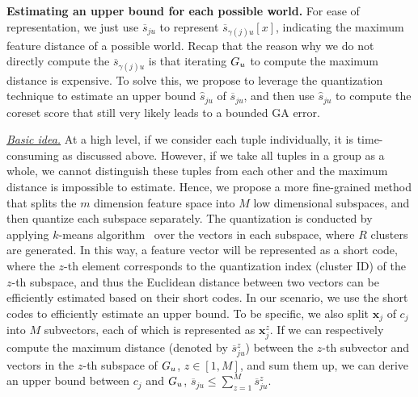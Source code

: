 \noindent \textbf{Estimating an upper bound for each possible world.} 
For ease of representation, we just use $\overline{s}_{ju}$ to represent  $\overline{s}_{\gamma(j)u}[x]$, indicating the maximum feature distance of a possible world.
%
%
 Recap that the reason why we do not directly compute the  $\overline{s}_{\gamma(j)u}$ is that iterating $G_u$ to compute the maximum distance is expensive.
To solve this, we propose to leverage the  quantization technique to estimate an upper bound $\hat{s}_{ju}$ of $\overline{s}_{ju}$, and then use $\hat{s}_{ju}$ to compute the coreset score  that still very likely leads to a bounded GA error.
  
\noindent  \underline{\textit{Basic idea.}} 
At a high level, if we consider each tuple individually, it is time-consuming as discussed above. However, if we take all tuples in a group as a whole, we cannot distinguish these tuples from each other and the maximum distance is impossible to estimate. Hence, we propose a more fine-grained  method that  splits the $m$ dimension feature space into  $M$ low dimensional subspaces, and then quantize each subspace separately.  
The quantization is conducted by applying $k$-means algorithm~\cite{hartigan1979algorithm} over the vectors in each subspace, where $R$ clusters are generated.  
In this way, a feature vector will be represented as a short code, where the $z$-th element corresponds to the quantization index (\ie cluster ID) of the $z$-th subspace, and thus the Euclidean distance between two vectors can be efficiently estimated based on their short codes. 
  In our scenario, we use the short codes to efficiently estimate an upper bound.
  To be specific, we also split  $\mathbf{x}_{j}$ of $c_j$  into $M$ subvectors, each of which is represented  as $\mathbf{x}^z_{j}$. If we can respectively compute the maximum distance (denoted by $\overline{s}_{ju}^z$) between the $z$-th subvector and vectors in the $z$-th  subspace of $G_u$, $z\in [1,M]$, and sum them up, we can derive  an upper bound  between $c_j$ and $G_u$, \ie $ \overline{s}_{ju} \leq  \sum_{z = 1}^M  \overline{s}_{ju}^z$.

